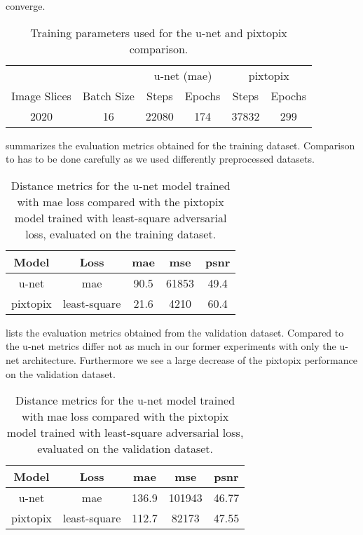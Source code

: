 converge.
\begin{table}[h]
  \centering
  \begin{tabular}{cccccc}
    \toprule
    & &
    \multicolumn{2}{c}{u-net (\gls{mae})} &
    \multicolumn{2}{c}{pixtopix} \\
    Image Slices & Batch Size & Steps & Epochs & Steps & Epochs \\
    \midrule
    \num{2020} & \num{16} & \num{22080} & \num{174} & \num{37832} & \num{299} \\
    \bottomrule
  \end{tabular}
  \caption{Training parameters used for the u-net and pixtopix comparison.
  }\label{tab:unet_pixtopix:params}
\end{table}
 summarizes the evaluation metrics obtained
for the training dataset. Comparison to  has to be
done carefully as we used differently preprocessed datasets.
\begin{table}[h]
  \centering
  \begin{tabular}{ccccc}
    \toprule
    Model & Loss &
    \acrshort{mae} &
    \acrshort{mse} &
    \acrshort{psnr} \\
    \midrule
    u-net & \acrshort{mae} & \num{90.5} & \num{61853} & \num{49.4} \\
    pixtopix & least-square & \num{21.6} & \num{4210} & \num{60.4} \\
    \bottomrule
  \end{tabular}
  \caption{Distance metrics for the u-net model trained with \acrshort{mae}
    loss compared with the pixtopix model trained with least-square adversarial
    loss, evaluated on the training dataset.
  }\label{tab:unet_pixtopix:training}
\end{table}
 lists the evaluation metrics obtained from
the validation dataset. Compared to  the
u-net metrics differ not as much in our former experiments with only the
u-net architecture. Furthermore we see a large decrease of the pixtopix
performance on the validation dataset.
\begin{table}[h]
  \centering
  \begin{tabular}{ccccc}
    \toprule
    Model & Loss &
    \acrshort{mae} &
    \acrshort{mse} &
    \acrshort{psnr} \\
    \midrule
    u-net & \acrshort{mae} & \num{136.9} & \num{101943} & \num{46.77} \\
    pixtopix & least-square & \num{112.7} & \num{82173} & \num{47.55} \\
    \bottomrule
  \end{tabular}
  \caption{Distance metrics for the u-net model trained with \acrshort{mae}
    loss compared with the pixtopix model trained with least-square adversarial
    loss, evaluated on the validation dataset.
  }\label{tab:unet_pixtopix:training}
\end{table}
